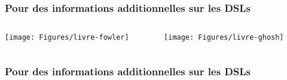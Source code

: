 \begin{frame}
\frametitle{Pour des informations additionnelles sur les DSLs}


\begin{columns}[b]

\begin{column}{5.5cm}
{
\texttt{[image: Figures/livre-fowler]}
}
\end{column}

\begin{column}{5.5cm}
{
\texttt{[image: Figures/livre-ghosh]}
}

\end{column}

\end{columns}




\end{frame}

\begin{frame}
\frametitle{Pour des informations additionnelles sur les DSLs}

\nocite{Fowler11}
\nocite{Ghosh11}
\nocite{Bentley86.2}
\nocite{MernikHeeSlo05}
\nocite{ArkinTek14}
\nocite{Fowler09}
\nocite{Voelter13}



\vspace{-0.25cm}

{\tiny

}

\NOTEvide

\end{frame}

